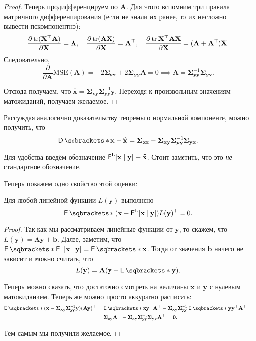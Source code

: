 \begin{proof}
	Теперь продифференцируем по \(\mathbf{A}\). Для этого вспомним три правила 
	матричного дифференцирования (если не знали их ранее, то их несложно 
	вывести покомпонентно):
	\[
		\frac{\partial \operatorname{tr}(\mathbf{X}^{\top}\mathbf{A})}{\partial 
		\mathbf{X}} = \mathbf{A}, \quad \frac{\partial 
		\operatorname{tr}(\mathbf{A}\mathbf{X})}{\partial \mathbf{X}} = 
		\mathbf{A}^{\top}, \quad \frac{\partial 
		\operatorname{tr}{\mathbf{X}^{\top}\mathbf{A}\mathbf{X}}}{\partial \mathbf{X}} = 
		(\mathbf{A} + \mathbf{A}^{\top})\mathbf{X}.
	\]
	Следовательно,
	\[
		\frac{\partial}{\partial \mathbf{A}}\mathrm{MSE}(\mathbf{A}) = 
		-2\bm{\Sigma}_{\mathbf{yx}} + 2\bm{\Sigma}_{\mathbf{yy}}\mathbf{A} = 0 
		\implies \mathbf{A} = \bm{\Sigma}_{\mathbf{yy}}^{-1} 
		\bm{\Sigma}_{\mathbf{yx}}.
	\]
	
	Отсюда получаем, что \(\hat{\mathbf{x}} = \bm{\Sigma}_{\mathbf{xy}} 
	\bm{\Sigma}_{\mathbf{yy}}^{-1}\mathbf{y}\). Переходя к произвольным 
	значениям матожиданий, получаем желаемое.
\end{proof}

Рассуждая аналогично доказательству теоремы о нормальной компоненте, можно 
получить, что
\[
	\D{\mathbf{x} - \hat{\mathbf{x}}} = \bm{\Sigma}_{\mathbf{xx}} - 
	\bm{\Sigma}_{\mathbf{xy}}\bm{\Sigma}_{\mathbf{yy}}^{-1} 
	\bm{\Sigma}_{\mathbf{yx}}.
\]

Для удобства введём обозначение \(\E^{\mathrm{L}}[\mathbf{x} \mid \mathbf{y}] 
\equiv \hat{\mathbf{x}}\). Стоит заметить, что это \emph{не} стандартное 
обозначение.

Теперь покажем одно свойство этой оценки:
\begin{property}
	Для любой линейной функции \(L(\mathbf{y})\) выполнено
	\[
		\E{(\mathbf{x} - \E^{\mathrm{L}}[\mathbf{x} \mid 
		\mathbf{y}])L(\mathbf{y})^{\top}} = 0.
	\]
\end{property}
\begin{proof}
	Так как мы рассматриваем линейные функции от \(\mathbf{y}\), то скажем, что 
	\(L(\mathbf{y}) = \mathbf{A}\mathbf{y} + \mathbf{b}\). Далее, заметим, что 
	\(\E{\E^{\mathrm{L}}[\mathbf{x} \mid \mathbf{y}]} = \E{\mathbf{x}}\). Тогда 
	от значения \(\mathbf{b}\) ничего не зависит и можно считать, что
	\[
		L(\mathbf{y}) = \mathbf{A}(\mathbf{y} - \E{\mathbf{y}}).
	\]
	
	Теперь можно сказать, что достаточно смотреть на величины \(\mathbf{x}\) и 
	\(\mathbf{y}\) с нулевым матожиданием. Теперь же можно просто аккуратно 
	расписать:
	\begin{align*}
		\E{(\mathbf{x} - \bm{\Sigma}_{\mathbf{xy}} \bm{\Sigma}_ 
		{\mathbf{yy}}^{-1} \mathbf{y})(\mathbf{A}\mathbf{y})^{\top}} &= 
		\E{\mathbf{xy}^{\top}}\mathbf{A}^{\top} - \bm{\Sigma}_{\mathbf{xy}} 
		\bm{\Sigma}_{\mathbf{yy}}^{-1}\E{\mathbf{yy}^{\top}}\mathbf{A}^{\top} = 
		\\
		&= \bm{\Sigma}_{\mathbf{xy}}\mathbf{A}^{\top} - 
		\bm{\Sigma}_{\mathbf{xy}}\bm{\Sigma}_{\mathbf{yy}}^{-1} 
		\bm{\Sigma}_{\mathbf{yy}}\mathbf{A}^{\top} = \mathbf{0}.
	\end{align*}
	
	Тем самым мы получили желаемое.
\end{proof}

